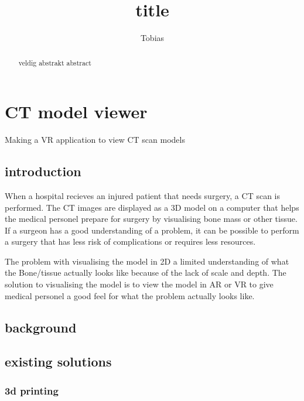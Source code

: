 \documentclass[11pt]{article}
\begin{document}
\title{title}

\author{Tobias} 

\maketitle

\newpage

\begin{abstract}
veldig abstrakt abstract
\end{abstract}

\tableofcontents

\newpage

\section{ CT model viewer}

Making a VR application to view CT scan models

\subsection{introduction}

When a hospital recieves an injured patient that needs surgery, a CT scan is performed. The CT images are displayed as a 3D model on a computer that helps the medical personel prepare for surgery by visualising bone mass or other tissue. If a surgeon has a good understanding of a problem, it can be possible to perform a surgery that has less risk of complications or requires less resources.

The problem with visualising the model in 2D a limited understanding of what the Bone/tissue actually looks like because of the lack of scale and depth. The solution to visualising the model is to view the model in AR or VR to give medical personel a good feel for what the problem actually looks like.

\subsection{ background }

\subsection{ existing solutions}

\subsubsection { 3d printing }
\end{document}

